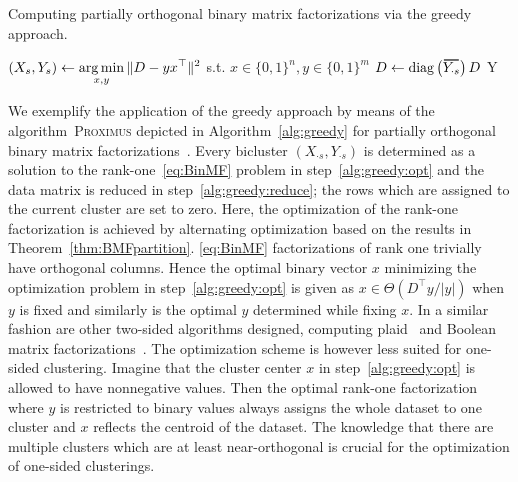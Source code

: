 \begin{algorithm}[t]
\caption{Computing partially orthogonal binary matrix factorizations via the greedy approach.} 
\begin{algorithmic}[1]
    	\State $\displaystyle(X_s,Y_s)\gets \operatorname*{arg\,min}_{x,y} \|D-yx^\top\|^2 $ \hfill s.t. $x\in\{0,1\}^n,y\in\{0,1\}^m$
    	\label{alg:greedy:opt}
    	\State $D\gets \diag\left(\thickbar{Y_{\cdot s}}\right)D$ \label{alg:greedy:reduce}
    \EndFor
    \State \Return Y
  \EndFunction
\end{algorithmic}
\label{alg:greedy}
\end{algorithm}

We exemplify the application of the greedy approach by means of the algorithm~\textsc{Proximus} depicted in Algorithm~\ref{alg:greedy} for partially orthogonal binary matrix factorizations~\citep{koyuturk2003proximus}. Every bicluster $(X_{\cdot s},Y_{\cdot s})$ is determined as a solution to the rank-one~\ref{eq:BinMF} problem in step~\ref{alg:greedy:opt} and the data matrix is reduced in step~\ref{alg:greedy:reduce}; the rows which are assigned to the current cluster are set to zero. Here, the optimization of the rank-one factorization is achieved by alternating optimization based on the results in Theorem~\ref{thm:BMFpartition}. \ref{eq:BinMF} factorizations of rank one trivially have orthogonal columns. Hence the optimal binary vector $x$ minimizing the optimization problem in step~\ref{alg:greedy:opt} is given as $x\in\Theta(D^\top y/|y|)$ when $y$ is fixed and similarly is the optimal $y$ determined while fixing $x$. In a similar fashion are other two-sided algorithms designed, computing plaid~\citep{cheng2000biclustering, lazzeroni2002plaid,turner2005improved} and Boolean matrix factorizations~\citep{miettinen2008discrete, geerts2004tiling}. The optimization scheme is however less suited for  one-sided clustering. Imagine that the cluster center $x$ in step~\ref{alg:greedy:opt} is allowed to have nonnegative values. Then the optimal rank-one factorization where $y$ is restricted to binary values always assigns the whole dataset to one cluster and $x$ reflects the centroid of the dataset. The knowledge that there are multiple clusters which are at least near-orthogonal is crucial for the optimization of one-sided clusterings.
